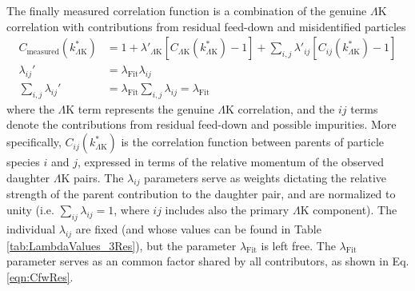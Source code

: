 \documentclass[ALICE,manyauthors]{cernphprep}
\newcommand{\LamK}{$\Lambda$K\xspace}
\begin{document}
The finally measured correlation function is a combination of the genuine \LamK correlation with contributions from residual feed-down and misidentified particles
\begin{equation}
\begin{aligned}
\label{eqn:CfwRes} 
 C_{\mathrm{measured}}(k^{*}_{\Lambda\mathrm{K}}) &= 1 + \lambda'_{\Lambda\mathrm{K}}[C_{\Lambda\mathrm{K}}(k^{*}_{\Lambda\mathrm{K}}) - 1] + \sum\limits_{i,j}  \lambda'_{ij}[C_{ij}(k^{*}_{\Lambda\mathrm{K}})-1] \\
 \lambda_{ij}' &= \lambda_{\mathrm{Fit}}\lambda_{ij} \\
 \sum\limits_{i,j}\lambda_{ij}' &=  \lambda_{\mathrm{Fit}}\sum\limits_{i,j}\lambda_{ij} = \lambda_{\mathrm{Fit}}
\end{aligned} 
\end{equation}
where the \LamK term represents the genuine \LamK correlation, and the $ij$ terms denote the contributions from residual feed-down and possible impurities.
More specifically, $C_{ij}(k^{*}_{\Lambda\mathrm{K}})$ is the correlation function between parents of particle species $i$ and $j$, expressed in terms of the relative momentum of the observed daughter \LamK pairs.  
The $\lambda_{ij}$ parameters serve as weights dictating the relative strength of the parent contribution to the daughter pair, and are normalized to unity (i.e. $\sum_{ij} \lambda_{ij} = 1$, where $ij$ includes also the primary \LamK component).
The individual $\lambda_{ij}$ are fixed (and whose values can be found in Table \ref{tab:LambdaValues_3Res}), but the parameter $\lambda_{\mathrm{Fit}}$ is left free.
The $\lambda_{\mathrm{Fit}}$ parameter serves as an common factor shared by all contributors, as shown in Eq. \ref{eqn:CfwRes}.
\end{document}
